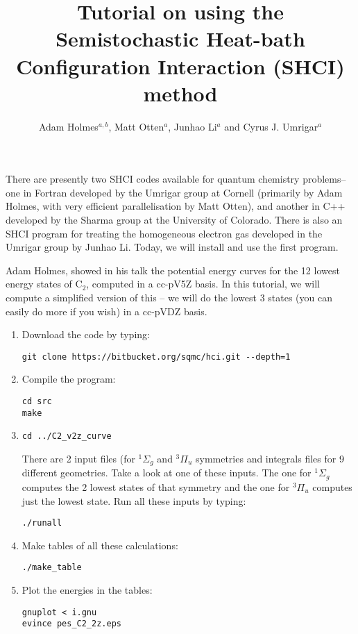 \documentclass[12pt,aps,prb,groupedaddress,amsmath,amssymb]{revtex4-1}
\begin{document}
\title{Tutorial on using the Semistochastic Heat-bath Configuration Interaction (SHCI) method}

\author{Adam Holmes$^{a,b}$, Matt Otten$^a$, Junhao Li$^a$ and Cyrus J. Umrigar$^a$}

\maketitle

There are presently two SHCI codes available for quantum chemistry problems-- one in Fortran developed by the Umrigar group
at Cornell (primarily by Adam Holmes, with very efficient parallelisation by Matt Otten), and another in C++
developed by the Sharma group at the University of Colorado.  There is also an SHCI program for treating the
homogeneous electron gas developed in the Umrigar group by Junhao Li.
Today, we will install and use the first program.

Adam Holmes, showed in his talk the potential energy curves for the 12 lowest energy states of C$_2$, computed in a cc-pV5Z basis.
In this tutorial, we will compute a simplified version of this -- we will do the lowest 3 states (you can easily do more if you wish)
in a cc-pVDZ basis.

\begin{enumerate}
\item Download the code by typing:
\begin{verbatim}
git clone https://bitbucket.org/sqmc/hci.git --depth=1
\end{verbatim}
\item
Compile the program:
\begin{verbatim}
cd src
make
\end{verbatim}
\item
\begin{verbatim}
cd ../C2_v2z_curve
\end{verbatim}
There are 2 input files (for $^1\Sigma_g$ and $^3\Pi_u$ symmetries and integrals files for 9 different geometries.  Take a look at one of these inputs.
The one for $^1\Sigma_g$ computes the 2 lowest states of that symmetry and the one for $^3\Pi_u$ computes just the lowest state.
Run all these inputs by typing:
\begin{verbatim}
./runall
\end{verbatim}
\item Make tables of all these calculations:
\begin{verbatim}
./make_table
\end{verbatim}
\item Plot the energies in the tables:
\begin{verbatim}
gnuplot < i.gnu
evince pes_C2_2z.eps
\end{verbatim}
\end{enumerate}
\end{document}
